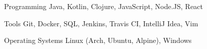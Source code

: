 

\begin{cvskills}

  \cvskill
    {Programming} %
    {Java, Kotlin, Clojure, JavaScript, Node.JS, React} %

  \cvskill
    {Tools} %
    {Git, Docker, SQL, Jenkins, Travis CI, IntelliJ Idea, Vim} %

  \cvskill
    {Operating Systems} %
    {Linux (Arch, Ubuntu, Alpine), Windows} %


\end{cvskills}
